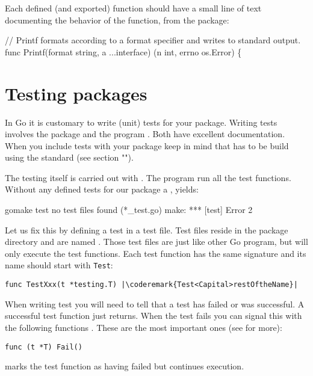 Each defined (and exported) function should have a small line of text
documenting the behavior of the function, from the 
package:
\begin{display}
// Printf formats according to a format specifier and writes to standard output.
func Printf(format string, a ...interface{}) (n int, errno os.Error) \{
\end{display}

\section{Testing packages}
In Go it is customary to write (unit) tests for your package. Writing
tests involves the  package and the program
. Both
have excellent documentation. When you include tests with your package
keep in mind that has to be build using the standard 
(see section "").



The testing itself is carried out with .
The  program run all the test functions. Without any
defined tests for our  package a , yields:
\begin{display}
\pr gomake test
no test files found (*_test.go)
make: *** [test] Error 2
\end{display}
Let us fix this by defining a test in a test file. Test files reside
in the package directory and are named . Those test
files are just like other Go program, but  will only
execute the test functions.
Each test function has the same signature and its name should start
with \lstinline{Test}:
\begin{lstlisting}
func TestXxx(t *testing.T) |\coderemark{Test<Capital>restOftheName}|
\end{lstlisting}

When writing test you will need to tell  that a test has
failed or was successful. A successful test function just returns. When
the test fails you can signal this with the following
functions \cite{go_doc}. These are the most important ones (see 
for more):

\begin{lstlisting}[numbers=none]
func (t *T) Fail()
\end{lstlisting}
 marks the test function as having failed but continues execution.

